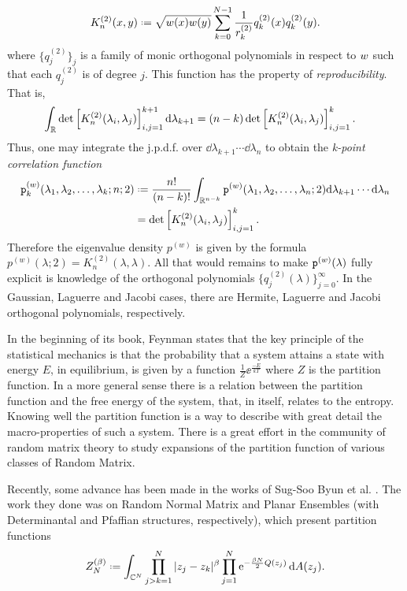 \begin{equation}
	K_n^{(2)}(x,y) \deff \sqrt{\wf(x) \wf(y)} \sum_{k=0}^{N-1} \frac{1}{r_k^{(2)}} q_k^{(2)}(x) q_k^{(2)}(y). \\
\end{equation}
where $\{q_j^{(2)}\}_j$ is a family of monic orthogonal polynomials in respect to $w$ such that each $q_j^{(2)}$ is of degree $j$. This function has the property of \textit{reproducibility}. That is,
\begin{align}
	\int_{\mathbb{R}} \det\left[ K_n^{(2)}(\lambda_i, \lambda_j) \right]_{i,j=1}^{k+1} \mathrm{d} \lambda_{k+1} & = (n-k) \det\left[ K_n^{(2)}(\lambda_i, \lambda_j) \right]_{i,j=1}^{k}.
	\label{Eq: Reproducibility}
\end{align}
Thus, one may integrate the j.p.d.f. over $\dd \lambda_{k+1} \cdots \dd \lambda_n$ to obtain the \textit{k-point correlation function}
\begin{align}
	\p_k^{(w)}(\mmany{\lambda}{k};n;2) & \deff \frac{n!}{(n-k)!} \int_{\R^{n-k}} \p^{(w)}(\mmany{\lambda}{n};2) \dd \lambda_{k+1} \cdots \dd \lambda_n \\
	& =
	\det\left[ K_n^{(2)}(\lambda_i, \lambda_j) \right]_{i,j=1}^{k}.
	\label{Equation: kernel}
\end{align}
Therefore the eigenvalue density $p^{(w)}$ is given by the formula
$
p^{(w)}(\lambda; 2) =  K_n^{(2)}(\lambda, \lambda).
$
All that would remains to make $\mathtt{p}^{(w)}(\lambda)$ fully explicit is knowledge of the orthogonal polynomials $\{q_j^{(2)}(\lambda)\}_{j=0}^\infty$. In the Gaussian, Laguerre and Jacobi cases, there are Hermite, Laguerre and Jacobi orthogonal polynomials, respectively.

In the beginning of its book, Feynman states \cite{feynmanstatistical} that the key principle of the statistical mechanics is that the probability that a system attains a state with energy $E$, in equilibrium, is given by a function $\frac{1}{Z} \ee^{\frac{-E}{kT}}$ where $Z$ is the partition function. In a more general sense there is a relation between the partition function and the free energy of the system, that, in itself, relates to the entropy. Knowing well the partition function is a way to describe with great detail the macro-properties of such a system. There is a great effort in the community of random matrix theory to study expansions of the partition function of various classes of Random Matrix. 

Recently, some advance has been made in the works of Sug-Soo Byun et al. \cite{Byun_2023}. The work they done was on Random Normal Matrix and Planar Ensembles (with Determinantal and Pfaffian structures, respectively), which present partition functions
\begin{equation}
	Z_N^{(\beta)} \deff \int_{\C^N}  \prod_{j>k=1}^{N} |z_j - z_k|^\beta \prod_{j=1}^{N} \ee^{-\frac{\beta N}{2} Q(z_j)} \dd A(z_j).
\end{equation}


